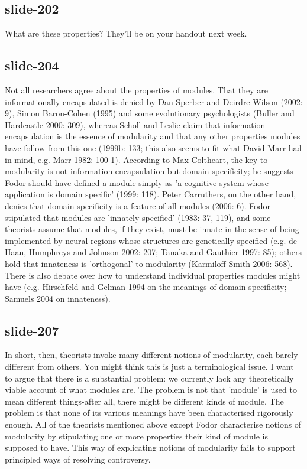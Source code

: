 \documentclass[12pt,\papersize]{extarticle}
\begin{document}
 
\subsection{slide-202}
What are these properties? They'll be on your handout next week.
 
 
\subsection{slide-204}
Not all researchers agree about the properties of modules. That they are informationally encapsulated is denied by Dan Sperber and Deirdre Wilson (2002: 9), Simon Baron-Cohen (1995) and some evolutionary psychologists (Buller and Hardcastle 2000: 309), whereas Scholl and Leslie claim that information encapsulation is the essence of modularity and that any other properties modules have follow from this one (1999b: 133; this also seems to fit what David Marr had in mind, e.g. Marr 1982: 100-1). According to Max Coltheart, the key to modularity is not information encapsulation but domain specificity; he suggests Fodor should have defined a module simply as 'a cognitive system whose application is domain specific' (1999: 118). Peter Carruthers, on the other hand, denies that domain specificity is a feature of all modules (2006: 6). Fodor stipulated that modules are 'innately specified' (1983: 37, 119), and some theorists assume that modules, if they exist, must be innate in the sense of being implemented by neural regions whose structures are genetically specified (e.g. de Haan, Humphreys and Johnson 2002: 207; Tanaka and Gauthier 1997: 85); others hold that innateness is 'orthogonal' to modularity (Karmiloff-Smith 2006: 568). There is also debate over how to understand individual properties modules might have (e.g. Hirschfeld and Gelman 1994 on the meanings of domain specificity; Samuels 2004 on innateness).
 
 
\subsection{slide-207}
In short, then, theorists invoke many different notions of modularity, each barely different from others. You might think this is just a terminological issue. I want to argue that there is a substantial problem: we currently lack any theoretically viable account of what modules are. The problem is not that 'module' is used to mean different things-after all, there might be different kinds of module. The problem is that none of its various meanings have been characterised rigorously enough. All of the theorists mentioned above except Fodor characterise notions of modularity by stipulating one or more properties their kind of module is supposed to have. This way of explicating notions of modularity fails to support principled ways of resolving controversy.
 
\end{document}
